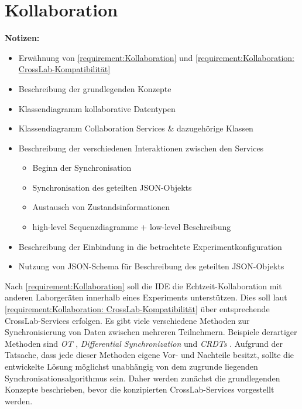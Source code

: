 \section{Kollaboration}\label{section:konzeption:kollaboration}

\usetikzlibrary{arrows.meta}

\begin{note}
    \textbf{Notizen:}
    \begin{itemize}
        \item Erwähnung von \autoref{requirement:Kollaboration} und \autoref{requirement:Kollaboration: CrossLab-Kompatibilität}
        \item Beschreibung der grundlegenden Konzepte
        \item Klassendiagramm kollaborative Datentypen
        \item Klassendiagramm Collaboration Services \& dazugehörige Klassen
        \item Beschreibung der verschiedenen Interaktionen zwischen den Services
              \begin{itemize}
                  \item Beginn der Synchronisation
                  \item Synchronisation des geteilten JSON-Objekts
                  \item Austausch von Zustandsinformationen
                  \item high-level Sequenzdiagramme + low-level Beschreibung
              \end{itemize}
        \item Beschreibung der Einbindung in die betrachtete Experimentkonfiguration
        \item Nutzung von JSON-Schema für Beschreibung des geteilten JSON-Objekts
    \end{itemize}
\end{note}

Nach \autoref{requirement:Kollaboration} soll die IDE die Echtzeit-Kollaboration mit anderen Laborgeräten innerhalb eines Experiments unterstützen. Dies soll laut \autoref{requirement:Kollaboration: CrossLab-Kompatibilität} über entsprechende CrossLab-Services erfolgen. Es gibt viele verschiedene Methoden zur Synchronisierung von Daten zwischen mehreren Teilnehmern. Beispiele derartiger Methoden sind \emph{\ac{OT}} \cite{sun_operational_1998}, \emph{Differential Synchronization} \cite{fraser_differential_2009} und \emph{\acp{CRDT}} \cite{shapiro_conflict-free_2011}. Aufgrund der Tatsache, dass jede dieser Methoden eigene Vor- und Nachteile besitzt, sollte die entwickelte Lösung möglichst unabhängig von dem zugrunde liegenden Synchronisationsalgorithmus sein. Daher werden zunächst die grundlegenden Konzepte beschrieben, bevor die konzipierten CrossLab-Services vorgestellt werden.

